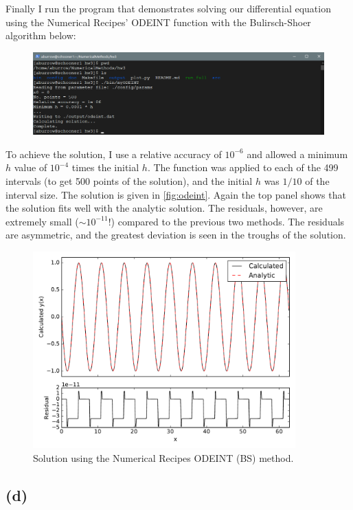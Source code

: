 \documentclass[12pt]{article}
\begin{document}
Finally I run the program that demonstrates solving our differential equation
using the Numerical Recipes' ODEINT function with the Bulirsch-Shoer algorithm
below:
\begin{figure}[H]
    \centering
    \includegraphics[width=1\textwidth]{myODEINT}
    \label{fig:myODEINT}
\end{figure}
To achieve the solution, I use a relative accuracy of $10^{-6}$ and allowed a
minimum $h$ value of $10^{-4}$ times the initial $h$. The function was applied
to each of the 499 intervals (to get 500 points of the solution), and the
initial $h$ was $1 / 10$ of the interval size. The solution is given in
\autoref{fig:odeint}. Again the top panel shows that the solution fits well
with the analytic solution. The residuals, however, are extremely small
($\sim10^{-11}$!) compared to the previous two methods. The residuals are
asymmetric, and the greatest deviation is seen in the troughs of the solution.
\begin{figure}[ht]
    \centering
    \includegraphics[width=0.9\textwidth]{odeint}
    \caption{Solution using the Numerical Recipes ODEINT (BS) method.}
    \label{fig:odeint}
\end{figure}

\subsection*{(d)}
\end{document}
